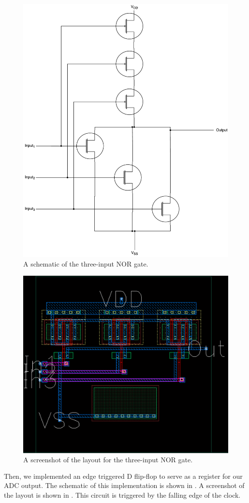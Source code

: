 \documentclass[journal,hidelinks]{IEEEtran}
\begin{document}
\begin{figure}[!htb]
  \centering
  \includegraphics[height=0.8\columnwidth]{diagrams/nor_gate_3.pdf}
  \caption{A schematic of the three-input NOR gate.}
  \label{fig:nor_gate_3}
\end{figure}

\begin{figure}[!htb]
  \centering
  \includegraphics[width=0.8\columnwidth]{layout/nor_gate_3.png}
  \caption{A screenshot of the layout for the three-input NOR gate.}
  \label{fig:nor_gate_3_layout}
\end{figure}

Then, we implemented an edge triggered D flip-flop to serve as a register for our ADC output. The schematic of this implementation is shown in . A screenshot of the layout is shown in . This circuit is triggered by the falling edge of the clock.
\end{document}
